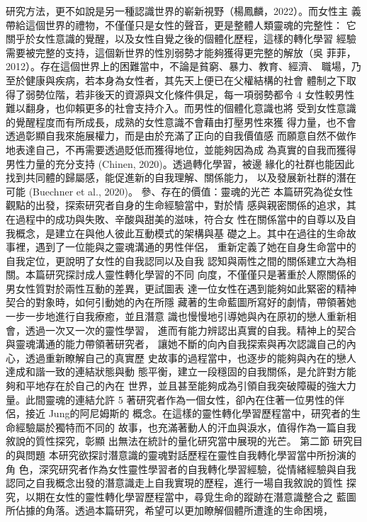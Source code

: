 研究方法，更不如說是另一種認識世界的嶄新視野（楊鳳麟，2022）。而女性主
義帶給這個世界的禮物，不僅僅只是女性的聲音，更是整體人類靈魂的完整性：
它關乎於女性意識的覺醒，以及女性自覺之後的個體化歷程，這樣的轉化學習
經驗需要被完整的支持，這個新世界的性別弱勢才能夠獲得更完整的解放（吳
菲菲，2012）。存在這個世界上的困難當中，不論是貧窮、暴力、教育、經濟、
職場，乃至於健康與疾病，若本身為女性者，其先天上便已在父權結構的社會
體制之下取得了弱勢位階，若非後天的資源與文化條件俱足，每一項弱勢都令
4 
女性較男性難以翻身，也仰賴更多的社會支持介入。而男性的個體化意識也將
受到女性意識的覺醒程度而有所成長，成熟的女性意識不會藉由打壓男性來獲
得力量，也不會透過彰顯自我來施展權力，而是由於充滿了正向的自我價值感
而願意自然不做作地表達自己，不再需要透過貶低而獲得地位，並能夠因為成
為真實的自我而獲得男性力量的充分支持 (Chinen, 2020)。透過轉化學習，被邊
緣化的社群也能因此找到共同體的歸屬感，能促進新的自我理解、關係能力，
以及發展新社群的潛在可能 (Buechner et al., 2020)。 
參、存在的價值：靈魂的光芒 
本篇研究為從女性觀點的出發，探索研究者自身的生命經驗當中，對於情
感與親密關係的追求，其在過程中的成功與失敗、辛酸與甜美的滋味，符合女
性在關係當中的自尊以及自我概念，是建立在與他人彼此互動模式的架構與基
礎之上。其中在過往的生命故事裡，遇到了一位能與之靈魂溝通的男性伴侶，
重新定義了她在自身生命當中的自我定位，更說明了女性的自我認同以及自我
認知與兩性之間的關係建立大為相關。本篇研究探討成人靈性轉化學習的不同
向度，不僅僅只是著重於人際關係的男女性質對於兩性互動的差異，更試圖表
達一位女性在遇到能夠如此緊密的精神契合的對象時，如何引動她的內在所隱
藏著的生命藍圖所寫好的劇情，帶領著她一步一步地進行自我療癒，並且潛意
識也慢慢地引導她與內在原初的戀人重新相會，透過一次又一次的靈性學習，
進而有能力辨認出真實的自我。精神上的契合與靈魂溝通的能力帶領著研究者，
讓她不斷的向內自我探索與再次認識自己的內心，透過重新瞭解自己的真實歷
史故事的過程當中，也逐步的能夠與內在的戀人達成和諧一致的連結狀態與動
態平衡，建立一段穩固的自我關係，是允許對方能夠和平地存在於自己的內在
世界，並且甚至能夠成為引領自我突破障礙的強大力量。此間靈魂的連結允許
5 
著研究者作為一個女性，卻內在住著一位男性的伴侶，接近 Jung的阿尼姆斯的
概念。在這樣的靈性轉化學習歷程當中，研究者的生命經驗屬於獨特而不同的
故事，也充滿著動人的汗血與淚水，值得作為一篇自我敘說的質性探究，彰顯
出無法在統計的量化研究當中展現的光芒。 
第二節 研究目的與問題 
本研究欲探討潛意識的靈魂對話歷程在靈性自我轉化學習當中所扮演的角
色，深究研究者作為女性靈性學習者的自我轉化學習經驗，從情緒經驗與自我
認同之自我概念出發的潛意識走上自我實現的歷程，進行一場自我敘說的質性
探究，以期在女性的靈性轉化學習歷程當中，尋覓生命的蹤跡在潛意識整合之
藍圖所佔據的角落。透過本篇研究，希望可以更加瞭解個體所遭逢的生命困境，
